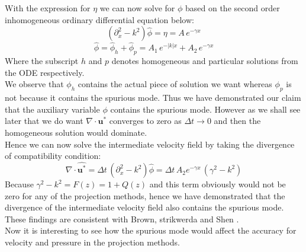 With the expression for $\eta$ we can now solve for $\phi$ based on the second order inhomogeneous ordinary differential equation below:
\begin{equation}
(\partial_x^2 - k^2)\hat{\phi} = \eta = A\,e^{-\gamma x}
\end{equation}
\begin{equation}
\hat{\phi} = \hat{\phi}_h + \hat{\phi}_p = A_1\,e^{-|k|x} + A_2 \,e^{-\gamma x}
\end{equation}
Where the subscript $h$ and $p$ denotes homogeneous and particular solutions from the ODE respectively.\\
We observe that $\phi_h$ contains the actual piece of solution we want whereas $\phi_p$ is not because it contains the spurious mode. Thus we have demonstrated our claim that the auxiliary variable $\phi$ contains the spurious mode. However as we shall see later that we do want $\nabla \cdot \textbf{u}^*$ converges to zero as $\Delta t \rightarrow 0$ and then the homogeneous solution would dominate.\\
Hence we can now solve the intermediate velocity field by taking the divergence of compatibility condition:
\begin{equation}
\nabla \cdot \hat{\textbf{u}^*} = \Delta t \,(\partial_x^2 - k^2)\hat{\phi} = \Delta t\,A_2 e^{-\gamma x}\,(\gamma^2 - k^2)
\end{equation}
Because $\gamma^2 - k^2 = F(z) = 1 + Q(z)$ and this term obviously would not be zero for any of the projection methods, hence we have demonstrated that the divergence of the intermediate velocity field also contains the spurious mode. These findings are consistent with Brown, strikwerda and Shen \cite{brown2001accurate, strikwerda1999accuracy}.\\

Now it is interesting to see how the spurious mode would affect the accuracy for velocity and pressure in the projection methods. \\

